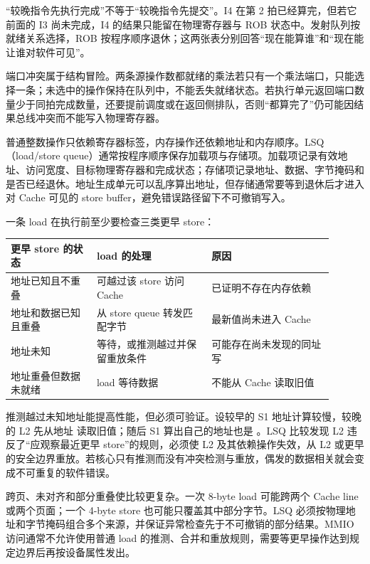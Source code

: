 “较晚指令先执行完成”不等于“较晚指令先提交”。I4 在第 2 拍已经算完，但若它前面的 I3 尚未完成，I4 的结果只能留在物理寄存器与 ROB 状态中。发射队列按就绪关系选择，ROB 按程序顺序退休；这两张表分别回答“现在能算谁”和“现在能让谁对软件可见”。

端口冲突属于结构冒险。两条源操作数都就绪的乘法若只有一个乘法端口，只能选择一条；未选中的操作保持在队列中，不能丢失就绪状态。若执行单元返回端口数量少于同拍完成数量，还要提前调度或在返回侧排队，否则“都算完了”仍可能因结果总线冲突而不能写入物理寄存器。


普通整数操作只依赖寄存器标签，内存操作还依赖地址和内存顺序。LSQ（load/store queue）通常按程序顺序保存加载项与存储项。加载项记录有效地址、访问宽度、目标物理寄存器和完成状态；存储项记录地址、数据、字节掩码和是否已经退休。地址生成单元可以乱序算出地址，但存储通常要等到退休后才进入对 Cache 可见的 store buffer，避免错误路径留下不可撤销写入。

一条 load 在执行前至少要检查三类更早 store：

\begin{longtable}{L{0.24\linewidth}L{0.32\linewidth}L{0.34\linewidth}}
\toprule
更早 store 的状态 & load 的处理 & 原因 \\
\midrule
地址已知且不重叠 & 可越过该 store 访问 Cache & 已证明不存在内存依赖 \\
地址和数据已知且重叠 & 从 store queue 转发匹配字节 & 最新值尚未进入 Cache \\
地址未知 & 等待，或推测越过并保留重放条件 & 可能存在尚未发现的同址写 \\
地址重叠但数据未就绪 & load 等待数据 & 不能从 Cache 读取旧值 \\
\bottomrule
\end{longtable}

推测越过未知地址能提高性能，但必须可验证。设较早的 S1 地址计算较慢，较晚的 L2 先从地址  读取旧值；随后 S1 算出自己的地址也是 。LSQ 比较发现 L2 违反了“应观察最近更早 store”的规则，必须使 L2 及其依赖操作失效，从 L2 或更早的安全边界重放。若核心只有推测而没有冲突检测与重放，偶发的数据相关就会变成不可重复的软件错误。

跨页、未对齐和部分重叠使比较更复杂。一次 8-byte load 可能跨两个 Cache line 或两个页面；一个 4-byte store 也可能只覆盖其中部分字节。LSQ 必须按物理地址和字节掩码组合多个来源，并保证异常检查先于不可撤销的部分结果。MMIO 访问通常不允许使用普通 load 的推测、合并和重放规则，需要等更早操作达到规定边界后再按设备属性发出。

